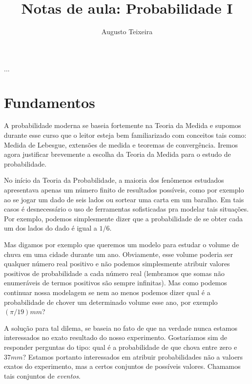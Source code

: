 \documentclass[reqno, final]{book}
\newcommand*\1{\mathds{1}}
\begin{document}
\title{Notas de aula: Probabilidade I}
\author{Augusto Teixeira}

\frontmatter

\maketitle

\mbox{}
\thispagestyle{empty}

\newpage

\setcounter{page}{1}

...

\newpage

\thispagestyle{empty}

\tableofcontents

\mainmatter

\chapter{Fundamentos}

A probabilidade moderna se baseia fortemente na Teoria da Medida e supomos durante esse curso que o leitor esteja bem familiarizado com conceitos tais como: Medida de Lebesgue, extensões de medida e teoremas de convergência.
Iremos agora justificar brevemente a escolha da Teoria da Medida para o estudo de probabilidade.

No início da Teoria da Probabilidade, a maioria dos fenômenos estudados apresentava apenas um número finito de resultados possíveis, como por exemplo ao se jogar um dado de seis lados ou sortear uma carta em um baralho.
Em tais casos é desnecessário o uso de ferramentas sofisticadas pra modelar tais situações.
Por exemplo, podemos simplesmente dizer que a probabilidade de se obter cada um dos lados do dado é igual a $1/6$.

Mas digamos por exemplo que queremos um modelo para estudar o volume de chuva em uma cidade durante um ano.
Obviamente, esse volume poderia ser qualquer número real positivo e não podemos simplesmente atribuir valores positivos de probabilidade a cada número real (lembramos que somas não enumeráveis de termos positivos são sempre infinitas).
Mas como podemos continuar nossa modelagem se nem ao menos podemos dizer qual é a probabilidade de chover um determinado volume esse ano, por exemplo $(\pi/19)mm$?

A solução para tal dilema, se baseia no fato de que na verdade nunca estamos interessados no exato resultado do nosso experimento.
Gostaríamos sim de responder perguntas do tipo: qual é a probabilidade de que chova entre zero e $37mm$?
Estamos portanto interessados em atribuir probabilidades não a valoers exatos do experimento, mas a certos conjuntos de possíveis valores.
Chamamos tais conjuntos de \emph{eventos}. 
\end{document}
